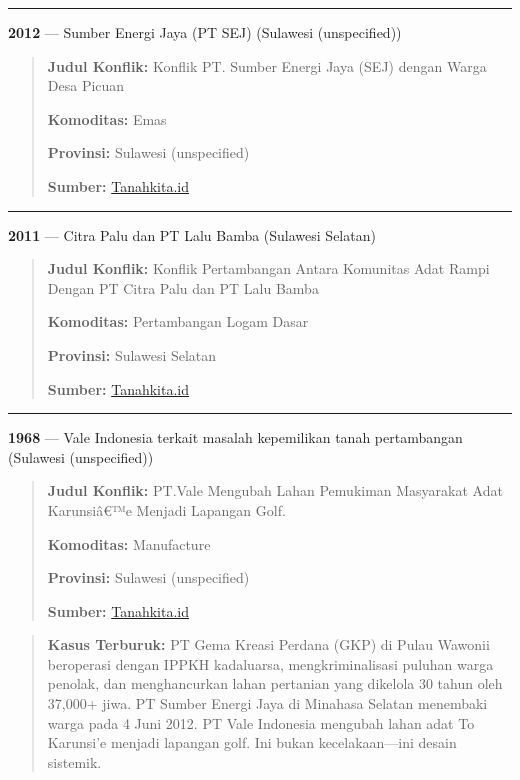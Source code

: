 \documentclass[
]{article}
\begin{document}
\begin{center}\rule{0.5\linewidth}{0.5pt}\end{center}

\textbf{2012} --- Sumber Energi Jaya (PT SEJ) (Sulawesi (unspecified))

\begin{quote}
\textbf{Judul Konflik:} Konflik PT. Sumber Energi Jaya (SEJ) dengan
Warga Desa Picuan

\textbf{Komoditas:} Emas

\textbf{Provinsi:} Sulawesi (unspecified)

\textbf{Sumber:}
\href{https://tanahkita.id/data/data/konflik/detil/NWRvX1hlbHF5YW8}{Tanahkita.id}
\end{quote}

\begin{center}\rule{0.5\linewidth}{0.5pt}\end{center}

\textbf{2011} --- Citra Palu dan PT Lalu Bamba (Sulawesi Selatan)

\begin{quote}
\textbf{Judul Konflik:} Konflik Pertambangan Antara Komunitas Adat Rampi
Dengan PT Citra Palu dan PT Lalu Bamba

\textbf{Komoditas:} Pertambangan Logam Dasar

\textbf{Provinsi:} Sulawesi Selatan

\textbf{Sumber:}
\href{https://tanahkita.id/data/data/konflik/detil/bVNDUWxiX1VpSzA}{Tanahkita.id}
\end{quote}

\begin{center}\rule{0.5\linewidth}{0.5pt}\end{center}

\textbf{1968} --- Vale Indonesia terkait masalah kepemilikan tanah
pertambangan (Sulawesi (unspecified))

\begin{quote}
\textbf{Judul Konflik:} PT.Vale Mengubah Lahan Pemukiman Masyarakat Adat
Karunsiâ€™e Menjadi Lapangan Golf.

\textbf{Komoditas:} Manufacture

\textbf{Provinsi:} Sulawesi (unspecified)

\textbf{Sumber:}
\href{https://tanahkita.id/data/data/konflik/detil/Zk04Wld1VzdqLXc}{Tanahkita.id}
\end{quote}

\begin{quote}
\textbf{Kasus Terburuk:} PT Gema Kreasi Perdana (GKP) di Pulau Wawonii
beroperasi dengan IPPKH kadaluarsa, mengkriminalisasi puluhan warga
penolak, dan menghancurkan lahan pertanian yang dikelola 30 tahun oleh
37,000+ jiwa. PT Sumber Energi Jaya di Minahasa Selatan menembaki warga
pada 4 Juni 2012. PT Vale Indonesia mengubah lahan adat To Karunsi'e
menjadi lapangan golf. Ini bukan kecelakaan---ini desain sistemik.
\end{quote}
\end{document}
